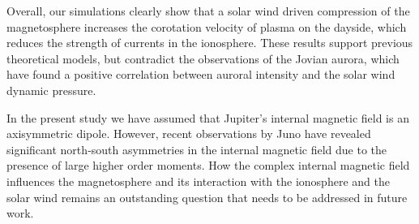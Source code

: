 Overall, our simulations clearly show that a solar wind driven compression of the magnetosphere increases the corotation velocity of plasma on the dayside, which reduces the strength of currents in the ionosphere. These results support previous theoretical models, but contradict the observations of the Jovian aurora, which have found a positive correlation between auroral intensity and the solar wind dynamic pressure. 

In the present study we have assumed that Jupiter's internal magnetic field is an axisymmetric dipole. However, recent observations by Juno have revealed significant north‐south asymmetries in the internal magnetic field \cite{Connerney2018} due to the presence of large higher order moments. How the complex internal magnetic field influences the magnetosphere and its interaction with the ionosphere and the solar wind remains an outstanding question that needs to be addressed in future work. 
